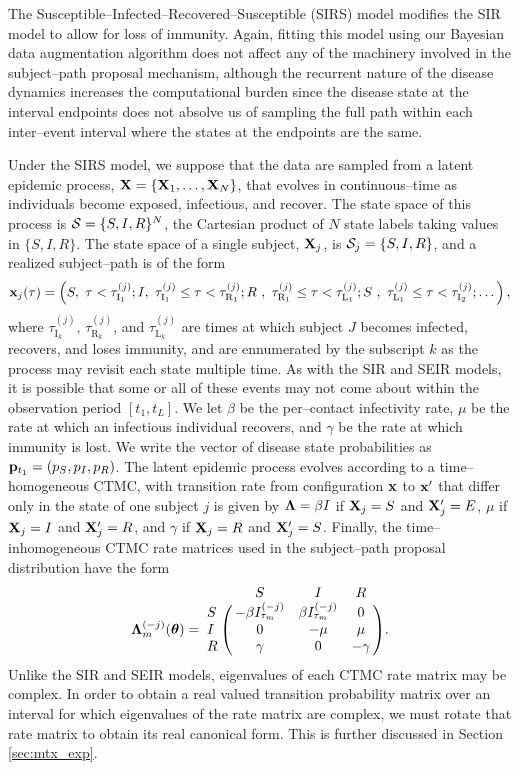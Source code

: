 The Susceptible--Infected--Recovered--Susceptible (SIRS) model modifies the SIR model to allow for loss of immunity. Again, fitting this model using our Bayesian data augmentation algorithm does not affect any of the machinery involved in the subject--path proposal mechanism, although the recurrent nature of the disease dynamics increases the computational burden since the disease state at the interval endpoints does not absolve us of sampling the full path within each inter--event interval where the states at the endpoints are the same.

Under the SIRS model, we suppose that the data are sampled from a latent epidemic process, $ \mathbf{X} = \lbrace \mathbf{X}_1,\dots,\mathbf{X}_N\rbrace $, that evolves in continuous--time as individuals become exposed, infectious, and recover. The state space of this process is $ \mathcal{S} = \lbrace S,I,R\rbrace^N $, the Cartesian product of $ N $ state labels taking values in $ \lbrace S,I,R\rbrace $. The state space of a single subject, $ \mathbf{X}_j $, is $\mathcal{S}_j = \lbrace S, I, R\rbrace $, and a realized subject--path is of the form $$ \mathbf{x}_j(\tau) = \left (S,\ \tau < \tau^{(j)}_{\mathrm{I}_1}; 
	I,\ \tau^{(j)}_{\mathrm{I}_1} \leq \tau < \tau^{(j)}_{\mathrm{R}_1};
	R\ ,\ \tau^{(j)}_{\mathrm{R}_1} \leq \tau < \tau^{(j)}_{\mathrm{L}_1}; 
	S\ ,\ \tau^{(j)}_{\mathrm{L}_1} \leq \tau < \tau^{(j)}_{\mathrm{I}_2};\dots
	\right ), $$
where $ \tau^{(j)}_{\mathrm{I}_k} $, $ \tau^{(j)}_{\mathrm{R}_k} $, and $ \tau^{(j)}_{\mathrm{L}_k} $ are times at which subject $ J $ becomes infected, recovers, and loses immunity, and are ennumerated by the subscript $ k $ as the process may revisit each state multiple time. As with the SIR and SEIR models, it is possible that some or all of these events may not come about within the observation period $ [t_1,t_L] $. We let $ \beta $ be the per--contact infectivity rate, $ \mu $ be the rate at which an infectious individual recovers, and $ \gamma $ be the rate at which immunity is lost. We write the vector of disease state probabilities as $ \mathbf{p}_{t_1} = (p_S,p_I,p_R) $. The latent epidemic process evolves according to a time--homogeneous CTMC, with transition rate from configuration $ \mathbf{x} $ to $ \mathbf{x}^\prime $ that differ only in the state of one subject $ j $ is given by $ \boldsymbol{\Lambda} = \beta I $ if $ \mathbf{X}_j = S $ and $ \mathbf{X}^\prime_j = E$, $ \mu $ if $ \mathbf{X}_j = I $ and $ \mathbf{X}^\prime_j = R$, and $ \gamma $ if $ \mathbf{X}_j = R $ and $ \mathbf{X}^\prime_j = S$. Finally, the time--inhomogeneous CTMC rate matrices used in the subject--path proposal distribution have the form
\begin{equation} \bLambda_m^{(-j)}(\btheta) = \bordermatrix{ & S & I & R \cr
	S & -\beta I_{\tau_m}^{(-j)} & \beta I_{\tau_m}^{(-j)} & 0  \cr 
	I & 0 & -\mu & \mu \cr
	R & \gamma & 0 & -\gamma }.
\end{equation}
Unlike the SIR and SEIR models, eigenvalues of each CTMC rate matrix may be complex. In order to obtain a real valued transition probability matrix over an interval for which eigenvalues of the rate matrix are complex, we must rotate that rate matrix to obtain its real canonical form. This is further discussed in Section \ref{sec:mtx_exp}.

